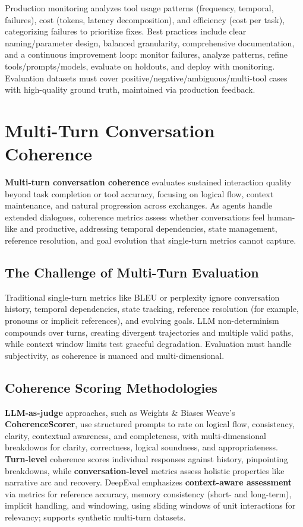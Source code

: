 \begin{TNtwocol}
Production monitoring analyzes tool usage patterns (frequency, temporal, failures), cost (tokens, latency decomposition), and efficiency (cost per task), categorizing failures to prioritize fixes. Best practices include clear naming/parameter design, balanced granularity, comprehensive documentation, and a continuous improvement loop: monitor failures, analyze patterns, refine tools/prompts/models, evaluate on holdouts, and deploy with monitoring. Evaluation datasets must cover positive/negative/ambiguous/multi-tool cases with high-quality ground truth, maintained via production feedback.

\section{Multi-Turn Conversation Coherence}

\textbf{Multi-turn conversation coherence} evaluates sustained interaction quality beyond task completion or tool accuracy, focusing on logical flow, context maintenance, and natural progression across exchanges. As agents handle extended dialogues, coherence metrics assess whether conversations feel human-like and productive, addressing temporal dependencies, state management, reference resolution, and goal evolution that single-turn metrics cannot capture.
​

\subsection*{The Challenge of Multi-Turn Evaluation}

Traditional single-turn metrics like BLEU or perplexity ignore conversation history, temporal dependencies, state tracking, reference resolution (for example, pronouns or implicit references), and evolving goals. LLM non-determinism compounds over turns, creating divergent trajectories and multiple valid paths, while context window limits test graceful degradation. Evaluation must handle subjectivity, as coherence is nuanced and multi-dimensional.
​

\subsection*{Coherence Scoring Methodologies}

\textbf{LLM-as-judge} approaches, such as Weights \& Biases Weave’s \textbf{CoherenceScorer}, use structured prompts to rate on logical flow, consistency, clarity, contextual awareness, and completeness, with multi-dimensional breakdowns for clarity, correctness, logical soundness, and appropriateness. \textbf{Turn-level} coherence scores individual responses against history, pinpointing breakdowns, while \textbf{conversation-level} metrics assess holistic properties like narrative arc and recovery. DeepEval emphasizes \textbf{context-aware assessment} via metrics for reference accuracy, memory consistency (short- and long-term), implicit handling, and windowing, using sliding windows of unit interactions for relevancy; supports synthetic multi-turn datasets.


\end{TNtwocol}
